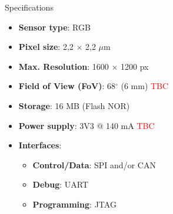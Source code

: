 %
%
%
%
%

%
%
%
%
%


\begin{frame}{Specifications}

    \begin{itemize}
        \item \textbf{Sensor type}: RGB
        \item \textbf{Pixel size}: 2,2 $\times$ 2,2 $\mu$m
        \item \textbf{Max. Resolution}: 1600 $\times$ 1200 px
        \item \textbf{Field of View (FoV)}: 68$^{\circ}$ (6 mm) \textcolor{red}{TBC}
        \item \textbf{Storage}: 16 MB (Flash NOR)
        \item \textbf{Power supply}: 3V3 @ 140 mA \textcolor{red}{TBC}
        \item \textbf{Interfaces}:
            \begin{itemize}
                \item \textbf{Control/Data}: SPI and/or CAN
                \item \textbf{Debug}: UART
                \item \textbf{Programming}: JTAG
            \end{itemize}
    \end{itemize}

\end{frame}


